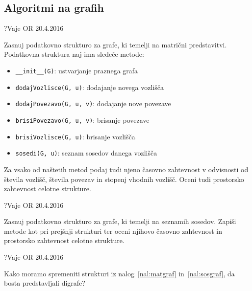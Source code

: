 \subsection{Algoritmi na grafih}

\begin{naloga}{?}{Vaje OR 20.4.2016}
\begin{vprasanje}
Zasnuj podatkovno strukturo za grafe,
ki temelji na matrični predstavitvi.
Podatkovna struktura naj ima sledeče metode:
\begin{itemize}
\item {\tt \_\_init\_\_(G)}: ustvarjanje praznega grafa
\item {\tt dodajVozlisce(G, u)}: dodajanje novega vozlišča
\item {\tt dodajPovezavo(G, u, v)}: dodajanje nove povezave
\item {\tt brisiPovezavo(G, u, v)}: brisanje povezave
\item {\tt brisiVozlisce(G, u)}: brisanje vozlišča
\item {\tt sosedi(G, u)}: seznam sosedov danega vozlišča
\end{itemize}
Za vsako od naštetih metod podaj tudi njeno časovno zahtevnost
v odvisnosti od števila vozlišč, števila povezav in stopenj vhodnih vozlišč.
Oceni tudi prostorsko zahtevnost celotne strukture.
\end{vprasanje}
\begin{odgovor}
\end{odgovor}
\end{naloga}


\begin{naloga}{?}{Vaje OR 20.4.2016}
\begin{vprasanje}
Zasnuj podatkovno strukturo za grafe,
ki temelji na seznamih sosedov.
Zapiši metode kot pri prejšnji strukturi
ter oceni njihovo časovno zahtevnost
in prostorsko zahtevnost celotne strukture.
\end{vprasanje}
\begin{odgovor}
\end{odgovor}
\end{naloga}


\begin{naloga}{?}{Vaje OR 20.4.2016}
\begin{vprasanje}
Kako moramo spremeniti strukturi
iz nalog~\ref{nal:matgraf} in~\ref{nal:sosgraf},
da bosta predstavljali digrafe?
\end{vprasanje}
\begin{odgovor}
\end{odgovor}
\end{naloga}



